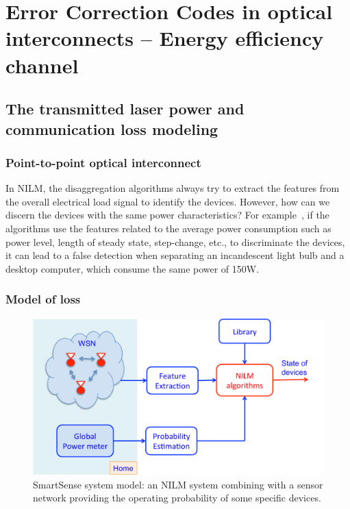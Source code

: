 

\chapter{Error Correction Codes in optical interconnects -- Energy efficiency channel} %
\label{SmartSense}

\section{The transmitted laser power and communication loss modeling}\label{model}
\subsection{Point-to-point optical interconnect}
In NILM, the disaggregation algorithms always try to extract the features from the overall electrical load signal to identify the devices. However, how can we discern the devices with the same power characteristics? For example~\cite{Laughman03PEM}, if the algorithms use the features related to the average power consumption such as power level, length of steady state, step-change, etc., to discriminate the devices, it can lead to a false detection when  separating an incandescent light bulb and a desktop computer, which consume the same power of 150W.
\subsection{Model of loss}

\begin{figure}[!hbt]
\begin{center}
\includegraphics[width=1\textwidth]{./chapters/chapter4/images/SSmodel.pdf}
\caption{SmartSense system model: an NILM system combining with a sensor network providing the operating probability of some specific devices.}
\label{fig:S1}
\end{center}
\end{figure}

